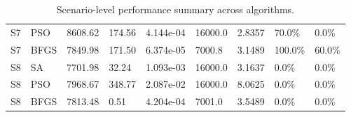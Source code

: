 \begin{table}[H]
\begin{tabular}{lllllllll}
S7 & PSO & 8608.62 & 174.56 & 4.144e-04 & 16000.0 & 2.8357 & 70.0\% & 0.0\% \\
S7 & BFGS & 7849.98 & 171.50 & 6.374e-05 & 7000.8 & 3.1489 & 100.0\% & 60.0\% \\
S8 & SA & 7701.98 & 32.24 & 1.093e-03 & 16000.0 & 3.1637 & 0.0\% & 0.0\% \\
S8 & PSO & 7968.67 & 348.77 & 2.087e-02 & 16000.0 & 8.0625 & 0.0\% & 0.0\% \\
S8 & BFGS & 7813.48 & 0.51 & 4.204e-04 & 7001.0 & 3.5489 & 0.0\% & 0.0\% \\
\bottomrule
\end{tabular}
\caption{Scenario-level performance summary across algorithms.}
\label{tab:scenario-summary}
\end{table}
